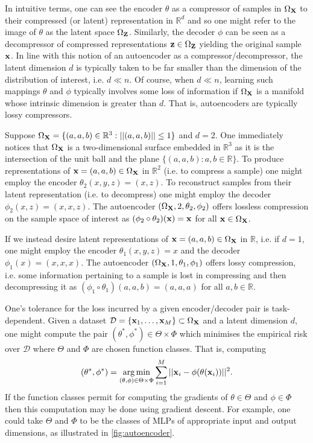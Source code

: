 \documentclass[11pt]{article}
\begin{document}
In intuitive terms, one can see the encoder $\theta$ as a compressor of samples in $\Omega_{\mathbf{X}}$ to their compressed (or latent) representation in $\mathbb{R}^d$ and so one might refer to the image of $\theta$ as the latent space $\Omega_{\mathbf{Z}}$. Similarly, the decoder $\phi$ can be seen as a decompressor of compressed representations $\mathbf{z}\in\Omega_{\mathbf{Z}}$ yielding the original sample $\mathbf{x}$. In line with this notion of an autoencoder as a compressor/decompressor, the latent dimension $d$ is typically taken to be far smaller than the dimension of the distribution of interest, i.e. $d\ll n$. Of course, when $d\ll n$, learning such mappings $\theta$ and $\phi$ typically involves some loss of information if $\Omega_{\mathbf{X}}$ is a manifold whose intrinsic dimension is greater than $d$. That is, autoencoders are typically lossy compressors.

\begin{tcolorbox}[title={\centering\textbf{Autoencoder example}}, colback=myLightBlue, colbacktitle=myDarkBlue, colframe=myDarkBlue, coltitle=white]
    Suppose $\Omega_{\mathbf{X}}=\{(a,a,b)\in\mathbb{R}^3:||(a,a,b)||\leq1\}$ and $d=2$. One immediately notices that $\Omega_{\mathbf{X}}$ is a two-dimensional surface embedded in $\mathbb{R}^3$ as it is the intersection of the unit ball and the plane $\{(a,a,b):a,b\in\mathbb{R}\}$. To produce representations of $\mathbf{x}=(a,a,b)\in\Omega_{\mathbf{X}}$ in $\mathbb{R}^2$ (i.e. to compress a sample) one might employ the encoder $\theta_2(x,y,z)=(x,z)$. To reconstruct samples from their latent representation (i.e. to decompress) one might employ the decoder $\phi_2(x,z)=(x,x,z)$. The autoencoder $(\Omega_{\mathbf{X}},2,\theta_2,\phi_2)$ offers lossless compression on the sample space of interest as $(\phi_2\circ\theta_2)(\mathbf{x})=\mathbf{x}$ for all $\mathbf{x}\in\Omega_{\mathbf{X}}$.
    
    \hspace{15pt} If we instead desire latent representations of $\mathbf{x}=(a,a,b)\in\Omega_{\mathbf{X}}$ in $\mathbb{R}$, i.e. if $d=1$, one might employ the encoder $\theta_1(x,y,z)=x$ and the decoder $\phi_1(x)=(x,x,x)$. The autoencoder $(\Omega_{\mathbf{X}},1,\theta_1,\phi_1)$ offers lossy compression, i.e. some information pertaining to a sample is lost in compressing and then decompressing it as $(\phi_1\circ\theta_1)(a,a,b)=(a,a,a)$ for all $a,b\in\mathbb{R}$.
\end{tcolorbox}

One's tolerance for the loss incurred by a given encoder/decoder pair is task-dependent. Given a dataset $\mathcal{D}=\{\mathbf{x}_1,\dots,\mathbf{x}_M\}\subset\Omega_{\mathbf{X}}$ and a latent dimension $d$, one might compute the pair $(\theta^*,\phi^*)\in\Theta\times\Phi$ which minimises the empirical risk over $\mathcal{D}$ where $\Theta$ and $\Phi$ are chosen function classes. That is, computing
$$
(\theta^*,\phi^*)
=
\operatorname*{arg\,min}_{(\theta,\phi)\in\Theta\times\Phi}
\sum_{i=1}^M||\mathbf{x}_i-\phi(\theta(\mathbf{x}_i))||^2.
$$
If the function classes permit for computing the gradients of $\theta\in\Theta$ and $\phi\in\Phi$ then this computation may be done using gradient descent. For example, one could take $\Theta$ and $\Phi$ to be the classes of MLPs of appropriate input and output dimensions, as illustrated in \autoref{fig:autoencoder}.
\end{document}
